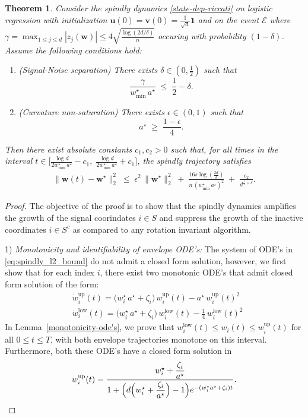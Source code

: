 \documentclass{article}
\theoremstyle{plain}
\newtheorem{theorem}{Theorem}[section]
\theoremstyle{definition}
\theoremstyle{remark}
\begin{document}
{\begin{theorem}
\label{thm:spindly_upper-restate}
Consider the spindly dynamics \eqref{state-dep-riccati} on logistic regression with initialization $\mathbf{u}(0)=\mathbf{v}(0)=\frac{1}{\sqrt{d}}\mathbf{1}$ and on the event $\mathcal{E}$ where $\gamma = \max_{1\le j\le d}|z_j(\boldsymbol w)|
\le
4\sqrt{\frac{\log(2d/\delta)}{n}}$ occuring with probability $(1-\delta)$. Assume the following conditions hold:
\begin{enumerate}
\item \label{A1}(Signal-Noise separation)
There exists $\delta\in(0,\tfrac12)$ such that
\[
\frac{\gamma}{w_{\min}^\star\, a^\star}
\;\le\;
\frac12-\delta.
\]
\item \label{A2} (Curvature non-saturation)
There exists $\epsilon \in(0,1)$ such that
\[
a^\star \;\ge\; \frac{1-\epsilon}{4}.
\]
\end{enumerate}
Then there exist absolute constants $c_1,c_2>0$ such that, for all times in the interval $t \in \Big[
\frac{\log d}{2w_{\min}^\star\, a^\star}-c_1,\;
\frac{\log d}{2w_{\min}^\star\, a^\star}+c_1
\Big]$, 
the spindly trajectory satisfies
\begin{align}
\label{eq:spindly_l2_bound-restate}
\|\mathbf w(t)-\mathbf w^\star\|_2^2
\;\le\;
\epsilon^2\,\|\mathbf w^\star\|_2^2
\;+\;
\frac{16s\log (\frac{2d}{\delta})}{n\, (w_{\min}^\star\, a^\star)^2}
\;+\;
\frac{c_2}{d^{\frac{1}{2}+\delta}}.
\end{align}
\end{theorem}


\begin{proof}
The objective of the proof is to show that the spindly dynamics amplifies the growth of the signal coorindates $i \in S$ and suppress the growth of the inactive coordinates  $i \in S^c$ as compared to any rotation invariant algorithm.

1) \textit{Monotonicity and identifiability of envelope ODE's:}
The system of ODE's in \eqref{eq:spindly_l2_bound} do not admit a closed form solution, however, we first show that for each index $i$, there exist two monotonic ODE's that admit closed form solution of the form: 
\begin{align}
&  \dot w^{\text{up}}_i(t)=   \bigl(w_i^\star\, a^\star + \zeta_i\bigr)\, w^{\text{up}}_i(t)
- a^\star\, w^{\text{up}}_i(t)^2 \\ 
& \dot w^{\text{low}}_i(t)=   \bigl(w_i^\star\, a^\star + \zeta_i\bigr)\, w^{\text{low}}_i(t)
- \frac{1}{4}\, w^{\text{low}}_i(t)^2
\end{align}  
In Lemma~\ref{monotonicity-ode's}, we prove that $w^{\text{low}}_i(t) \leq w_{i}(t) \leq w^{\text{up}}_i(t)$ for all $0\leq t \leq T$, with both envelope trajectories monotone on this interval. Furthermore, both these ODE's have a closed form solution in
\begin{align}
w_i^{\mathrm{up}}(t)
=
\frac{w_i^\star + \dfrac{\zeta_i}{a^\star}}%
{1+\Bigl(d\Bigl(w_i^\star+\dfrac{\zeta_i}{a^\star}\Bigr)-1\Bigr)
e^{-(w_i^\star a^\star+\zeta_i)t}}.
\end{align}


\end{proof}}
\end{document}
